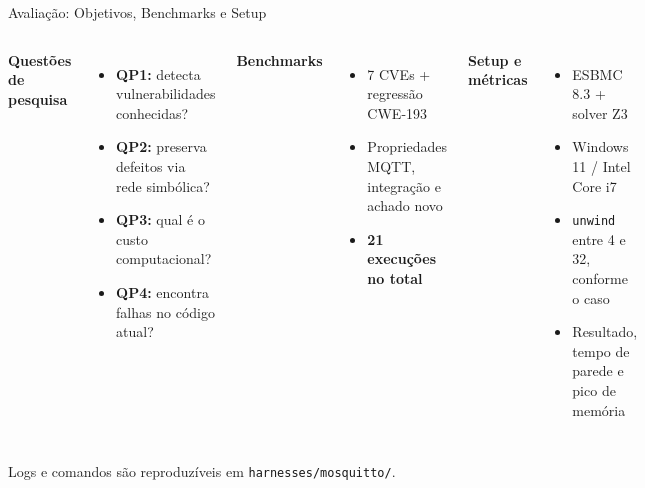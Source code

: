 \documentclass[10pt,aspectratio=169]{beamer}
\begin{document}
\begin{frame}{Avalia\c{c}\~ao: Objetivos, Benchmarks e Setup}
    \begin{columns}[T]
        \textbf{Quest\~oes de pesquisa}
        \begin{itemize}\small
            \item \textbf{QP1:} detecta vulnerabilidades conhecidas?
            \item \textbf{QP2:} preserva defeitos via rede simb\'olica?
            \item \textbf{QP3:} qual \'e o custo computacional?
            \item \textbf{QP4:} encontra falhas no c\'odigo atual?
        \end{itemize}
        \textbf{Benchmarks}
        \begin{itemize}\small
            \item 7 CVEs + regress\~ao CWE-193
            \item Propriedades MQTT, integra\c{c}\~ao e achado novo
            \item \textbf{21 execu\c{c}\~oes no total}
        \end{itemize}
        \textbf{Setup e m\'etricas}
        \begin{itemize}\small
            \item ESBMC 8.3 + solver Z3
            \item Windows 11 / Intel Core i7
            \item \texttt{unwind} entre 4 e 32, conforme o caso
            \item Resultado, tempo de parede e pico de mem\'oria
        \end{itemize}
    \end{columns}
    \vspace{0.6em}
    \small Logs e comandos s\~ao reproduz\'iveis em
    \texttt{harnesses/mosquitto/}.
\end{frame}
\end{document}
